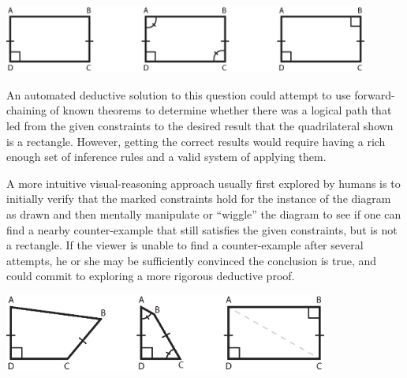 \documentclass[10pt]{article}
\begin{document}
\begin{center}
\includegraphics[width=0.90\textwidth]{diagrams/rectangles.eps}
\end{center}


\onehalfspacing

An automated deductive solution to this question could attempt to use
forward-chaining of known theorems to determine whether there was a
logical path that led from the given constraints to the desired result
that the quadrilateral shown is a rectangle.  However, getting the
correct results would require having a rich enough set of inference
rules and a valid system of applying them.

\newpage
A more intuitive visual-reasoning approach usually first explored by
humans is to initially verify that the marked constraints hold for the
instance of the diagram as drawn and then mentally manipulate or
``wiggle'' the diagram to see if one can find a nearby counter-example
that still satisfies the given constraints, but is not a rectangle.
If the viewer is unable to find a counter-example after several
attempts, he or she may be sufficiently convinced the conclusion is
true, and could commit to exploring a more rigorous deductive proof.

\singlespacing

\begin{center}
\includegraphics[width=0.80\textwidth]{diagrams/rectangles-answer.eps}
\end{center}

\end{document}
